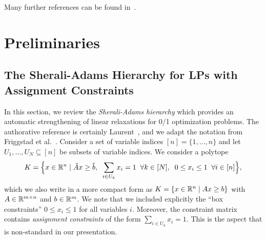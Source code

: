 
\bigskip
\noindent
Many further references can be found in~\cite{VeltmanLL90,GiroudeauKMP08,Drozdowski09,GiroudeauKoenig07,ColinC91,JungKS93,HanenMunierDuplication}.






















\section{Preliminaries}\label{sec: prelims_scheduling}


\subsection{The Sherali-Adams Hierarchy for LPs with Assignment Constraints}

In this section, we review the \emph{Sherali-Adams hierarchy} which provides an automatic strengthening of
linear relaxations for 0/1 optimization problems.
The authorative reference is certainly Laurent~\cite{Comparison-of-Hierarchies-Laurent-MOR03},
and we adapt the notation from Friggstad et al.~\cite{LP-for-DST-FriggstadKKLST-IPCO14}.
Consider a set of variable indices $[n] = \{ 1,\ldots,n\}$ and let $U_1,\ldots,U_N \subseteq [n]$
be subsets of variable indices.
We consider a polytope
\[
  K = \Big\{ x \in \mathbb{R}^n \mid \tilde{A}x \geq \tilde{b}, \;\; \sum_{i \in U_k} x_i = 1 \;\; \forall k \in [N], \;\; 0 \leq x_i \leq 1 \;\; \forall i \in [n] \Big\},
\]
which we also write in a more compact form as $K = \{ x \in \mathbb{R}^n \mid Ax \geq b\}$ with $A \in \mathbb{R}^{m \times n}$ and $b \in \mathbb{R}^m$.
We note that we included  explicitly the ``box constraints'' $0 \leq x_i \leq 1$ for all variables $i$.
Moreover, the constraint matrix contains \emph{assignment constraints} of the form $\sum_{i \in U_k} x_i = 1$.
This is the aspect that is non-standard in our presentation.

